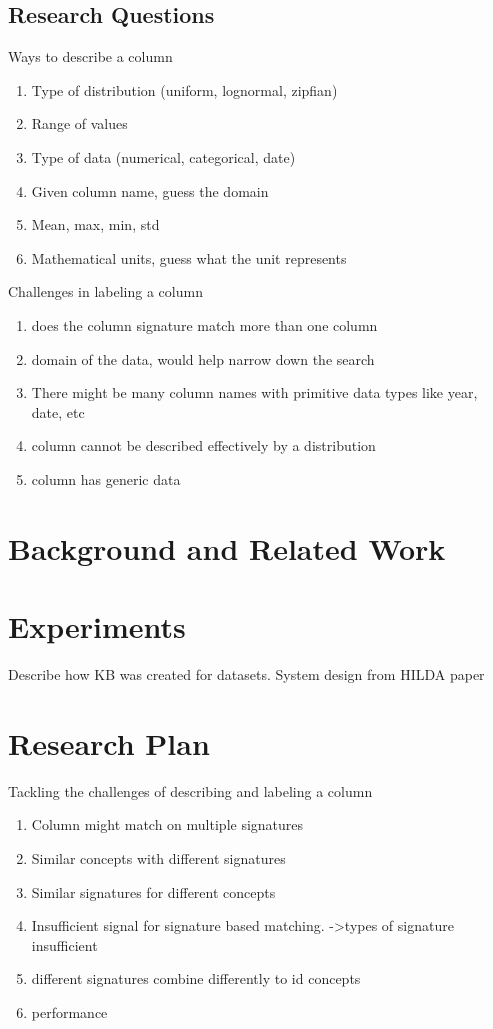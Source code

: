 \documentclass{vldb}
\begin{document}
\subsection{Research Questions}
Ways to describe a column
\begin{enumerate}
	\item Type of distribution (uniform, lognormal, zipfian)
	\item Range of values
	\item Type of data (numerical, categorical, date)
	\item Given column name, guess the domain
	\item Mean, max, min, std
	\item Mathematical units, guess what the unit represents
\end{enumerate}

Challenges in labeling a column
\begin{enumerate}
	\item does the column signature match more than one column
	\item domain of the data, would help narrow down the search
	\item There might be many column names with primitive data types like year, date, etc
	\item column cannot be described effectively by a distribution
	\item column has generic data
\end{enumerate}

\section{Background and Related Work}

\section{Experiments}
Describe how KB was created for datasets. System design from HILDA paper

\section{Research Plan}
Tackling the challenges of describing and labeling a column
\begin{enumerate}
	\item Column might match on multiple signatures
	\item Similar concepts with different signatures
	\item Similar signatures for different concepts
	\item Insufficient signal for signature based matching.
		->types of signature insufficient
	\item different signatures combine differently to id concepts
	\item performance
\end{enumerate}
\end{document}

